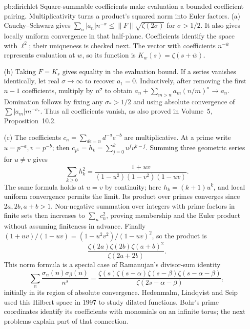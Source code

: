 \begin{solution}{pb:dirichlet}
\idea Square-summable coefficients make evaluation a bounded coefficient pairing. Multiplicativity turns a product's squared norm into Euler factors.
\writeup (a) Cauchy--Schwarz gives $\sum_n|a_n|n^{-\sigma}\le\|F\|\sqrt{\zeta(2\sigma)}$ for $\sigma>1/2$. It also gives locally uniform convergence in that half-plane. Coefficients identify the space with $\ell^2$; their uniqueness is checked next. The vector with coefficients $n^{-\bar w}$ represents evaluation at $w$, so its function is $K_w(s)=\zeta(s+\bar w)$.

(b) Taking $F=K_s$ gives equality in the evaluation bound. If a series vanishes identically, let real $\sigma\to\infty$ to recover $a_1=0$. Inductively, after removing the first $n-1$ coefficients, multiply by $n^\sigma$ to obtain $a_n+\sum_{m>n}a_m(n/m)^\sigma\to a_n$. Domination follows by fixing any $\sigma_*>1/2$ and using absolute convergence of $\sum|a_m|m^{-\sigma_*}$. Thus all coefficients vanish, as also proved in Volume~5, Proposition~10.2.

(c) The coefficients $c_n=\sum_{de=n}d^{-a}e^{-b}$ are multiplicative. At a prime write $u=p^{-a},v=p^{-b}$; then $c_{p^k}=h_k=\sum_{j=0}^ku^jv^{k-j}$. Summing three geometric series for $u\ne v$ gives
\[\sum_{k\ge0}h_k^2=\frac{1+uv}{(1-u^2)(1-v^2)(1-uv)}.
\]
The same formula holds at $u=v$ by continuity; here $h_k=(k+1)u^k$, and local uniform convergence permits the limit. Its product over primes converges since $2a,2b,a+b>1$. Non-negative summation over integers with prime factors in finite sets then increases to $\sum_nc_n^2$, proving membership and the Euler product without assuming finiteness in advance. Finally $(1+uv)/(1-uv)=(1-u^2v^2)/(1-uv)^2$, so the product is
\[\frac{\zeta(2a)\zeta(2b)\zeta(a+b)^2}{\zeta(2a+2b)}.
\]
\leads This norm formula is a special case of Ramanujan's divisor-sum identity
\[\sum_n\frac{\sigma_\alpha(n)\sigma_\beta(n)}{n^s}
 =\frac{\zeta(s)\zeta(s-\alpha)\zeta(s-\beta)\zeta(s-\alpha-\beta)}{\zeta(2s-\alpha-\beta)},
\]
initially in its region of absolute convergence. Hedenmalm, Lindqvist and Seip used this Hilbert space in 1997 to study dilated functions. Bohr's prime coordinates identify its coefficients with monomials on an infinite torus; the next problems explain part of that connection.
\end{solution}
